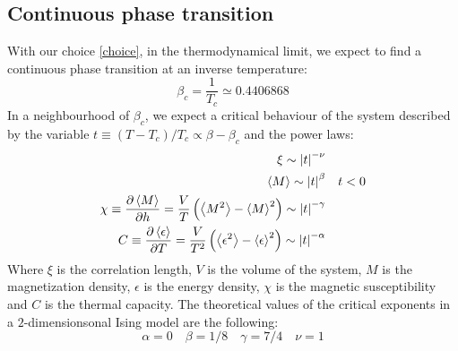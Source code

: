 \documentclass[11pt]{scrartcl} %
\begin{document}
\subsection{Continuous phase transition}
With our choice \eqref{choice}, in the thermodynamical limit, we expect to find a continuous phase transition at an inverse temperature:
\begin{equation}
	\label{bta_theory}
	\beta _c = \frac{1}{T_c} \simeq 0.4406868
\end{equation}
In a neighbourhood of $\beta _c$, we expect a critical behaviour of the system described by the variable $t\equiv (T-T_c)/T_c \propto\beta - \beta _c$ and the power laws:
\begin{eqnarray}
	\label{power}
	\xi \sim \left\lvert t\right\rvert^{-\nu} & \\
	\left\langle M \right\rangle \sim \left\lvert t\right\rvert ^{\beta} & \quad t<0\\
	\chi \equiv \frac{\partial \left\langle M \right\rangle}{\partial h} = \frac{V}{T}\left(\left\langle M^2 \right\rangle-\left\langle M \right\rangle ^2\right)\sim \left\lvert t\right\rvert ^{-\gamma} & \\
	C \equiv \frac{\partial \left\langle \epsilon \right\rangle}{\partial T} = \frac{V}{T^2}\left(\left\langle \epsilon^2 \right\rangle-\left\langle \epsilon \right\rangle ^2\right) \sim \left\lvert t\right\rvert^{-\alpha} &
\end{eqnarray}
Where $\xi$ is the correlation length, $V$ is the volume of the system, $M$ is the magnetization density, $\epsilon$ is the energy density, $\chi$ is the magnetic susceptibility and $C$ is the thermal capacity.
The theoretical values of the critical exponents in a $2$-dimensionsonal Ising model are the following:
\begin{equation}
\label{exponents}
\alpha = 0 \quad \beta = 1/8 \quad \gamma = 7/4 \quad \nu =1
\end{equation}
\end{document}

